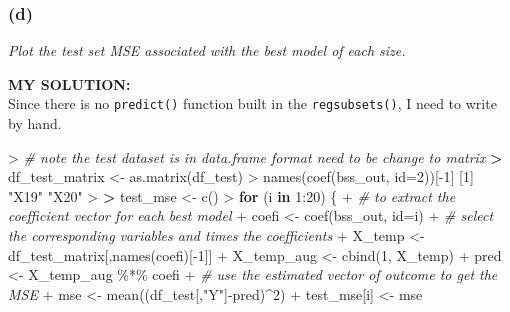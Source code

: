 \documentclass[
]{article}
\newenvironment{Shaded}{\begin{snugshade}}{\end{snugshade}}
\newcommand{\AttributeTok}[1]{\textcolor[rgb]{0.77,0.63,0.00}{#1}}
\newcommand{\CommentTok}[1]{\textcolor[rgb]{0.56,0.35,0.01}{\textit{#1}}}
\newcommand{\ControlFlowTok}[1]{\textcolor[rgb]{0.13,0.29,0.53}{\textbf{#1}}}
\newcommand{\DecValTok}[1]{\textcolor[rgb]{0.00,0.00,0.81}{#1}}
\newcommand{\ErrorTok}[1]{\textcolor[rgb]{0.64,0.00,0.00}{\textbf{#1}}}
\newcommand{\FunctionTok}[1]{\textcolor[rgb]{0.00,0.00,0.00}{#1}}
\newcommand{\NormalTok}[1]{#1}
\newcommand{\OtherTok}[1]{\textcolor[rgb]{0.56,0.35,0.01}{#1}}
\newcommand{\SpecialCharTok}[1]{\textcolor[rgb]{0.00,0.00,0.00}{#1}}
\newcommand{\StringTok}[1]{\textcolor[rgb]{0.31,0.60,0.02}{#1}}
\begin{document}
\hypertarget{d}{%
\subsubsection{(d)}\label{d}}

\emph{Plot the test set MSE associated with the best model of each
size.}

\textbf{MY SOLUTION:}\\
Since there is no \texttt{predict()} function built in the
\texttt{regsubsets()}, I need to write by hand.

\begin{Shaded}
\begin{Highlighting}[]
\SpecialCharTok{\textgreater{}} \CommentTok{\# note the test dataset is in data.frame format need to be change to matrix}
\ErrorTok{\textgreater{}}\NormalTok{ df\_test\_matrix }\OtherTok{\textless{}{-}} \FunctionTok{as.matrix}\NormalTok{(df\_test)}
\SpecialCharTok{\textgreater{}} \FunctionTok{names}\NormalTok{(}\FunctionTok{coef}\NormalTok{(bss\_out, }\AttributeTok{id=}\DecValTok{2}\NormalTok{))[}\SpecialCharTok{{-}}\DecValTok{1}\NormalTok{]}
\NormalTok{[}\DecValTok{1}\NormalTok{] }\StringTok{"X19"} \StringTok{"X20"}
\SpecialCharTok{\textgreater{}} 
\ErrorTok{\textgreater{}}\NormalTok{ test\_mse }\OtherTok{\textless{}{-}} \FunctionTok{c}\NormalTok{()}
\SpecialCharTok{\textgreater{}} \ControlFlowTok{for}\NormalTok{ (i }\ControlFlowTok{in} \DecValTok{1}\SpecialCharTok{:}\DecValTok{20}\NormalTok{) \{}
\SpecialCharTok{+}   \CommentTok{\# to extract the coefficient vector for each best model}
\SpecialCharTok{+}\NormalTok{   coefi }\OtherTok{\textless{}{-}} \FunctionTok{coef}\NormalTok{(bss\_out, }\AttributeTok{id=}\NormalTok{i)}
\SpecialCharTok{+}   \CommentTok{\# select the corresponding variables and times the coefficients}
\SpecialCharTok{+}\NormalTok{   X\_temp }\OtherTok{\textless{}{-}}\NormalTok{ df\_test\_matrix[,}\FunctionTok{names}\NormalTok{(coefi)[}\SpecialCharTok{{-}}\DecValTok{1}\NormalTok{]]}
\SpecialCharTok{+}\NormalTok{   X\_temp\_aug }\OtherTok{\textless{}{-}} \FunctionTok{cbind}\NormalTok{(}\DecValTok{1}\NormalTok{, X\_temp)}
\SpecialCharTok{+}\NormalTok{   pred }\OtherTok{\textless{}{-}}\NormalTok{ X\_temp\_aug }\SpecialCharTok{\%*\%}\NormalTok{ coefi}
\SpecialCharTok{+}   \CommentTok{\# use the estimated vector of outcome to get the MSE}
\SpecialCharTok{+}\NormalTok{   mse }\OtherTok{\textless{}{-}} \FunctionTok{mean}\NormalTok{((df\_test[,}\StringTok{"Y"}\NormalTok{]}\SpecialCharTok{{-}}\NormalTok{pred)}\SpecialCharTok{\^{}}\DecValTok{2}\NormalTok{)}
\SpecialCharTok{+}\NormalTok{   test\_mse[i] }\OtherTok{\textless{}{-}}\NormalTok{ mse}

\end{Highlighting}
\end{Shaded}
\end{document}
